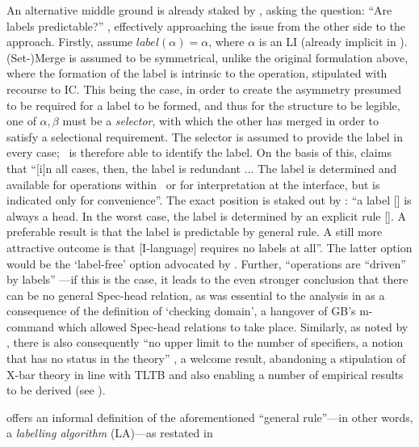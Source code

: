 An alternative middle ground is already staked by \textcite{ChomskyN_2000}, asking the question: ``Are labels predictable?'' \parencite[133]{ChomskyN_2000}, effectively approaching the issue from the other side to the \textcite{CollinsC_2002} approach. Firstly, assume $label(\alpha)=\alpha$, where $\alpha$ is an LI (already implicit in ). (Set-)Merge is assumed to be symmetrical, unlike the original formulation above, where the formation of the label is intrinsic to the operation, stipulated with recourse to IC. This being the case, in order to create the asymmetry presumed to be required for a label to be formed, and thus for the structure to be legible, one of $\alpha,\beta$ must be a \textit{selector}, with which the other has merged in order to satisfy a selectional requirement. The selector is assumed to provide the label in every case; \CHL\ is therefore able to identify the label. On the basis of this, \textcite[135]{ChomskyN_2000} claims that ``[i]n all cases, then, the label is redundant ... The label is determined and available for operations within \CHL\ or for interpretation at the interface, but is indicated only for convenience''. The exact position is staked out by \textcite[109]{ChomskyN_2004}: ``a label [] is always a head. In the worst case, the label is determined by an explicit rule []. A preferable result is that the label is predictable by general rule. A still more attractive outcome is that [I-language] requires no labels at all''. The latter option would be the `label-free' option advocated by \textcite{CollinsC_2002,SeelyTD_2006}. Further, ``operations are ``driven'' by labels'' \parencite[109]{ChomskyN_2004}---if this is the case, it leads to the even stronger conclusion that there can be no general Spec-head relation, as was essential to the analysis in \textcite{ChomskyN_2005} as a consequence of the definition of `checking domain', a hangover of GB's m-command which allowed Spec-head relations to take place. Similarly, as noted by \textcite{BlumelA_2017a}, there is also consequently ``no upper limit to the number of specifiers, a notion that has no status in the theory'' \parencite[51]{BlumelA_2017a}, a welcome result, abandoning a stipulation of X-bar theory in line with TLTB and also enabling a number of empirical results to be derived (see ).

\textcite{ChomskyN_2008} offers an informal definition of the aforementioned ``general rule''---in other words, a \textit{labelling algorithm} (LA)---as restated in 


